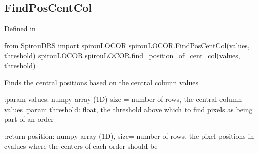 \begin{minipage}{\textwidth}
\subsection{FindPosCentCol}

Defined in \spirouLOCOR{}

\begin{pythonbox}
from SpirouDRS import spirouLOCOR
spirouLOCOR.FindPosCentCol(values, threshold)
spirouLOCOR.spirouLOCOR.find_position_of_cent_col(values, threshold)
\end{pythonbox}

\begin{pythondocstring}
Finds the central positions based on the central column values

:param values: numpy array (1D) size = number of rows,
                the central column values
:param threshold: float, the threshold above which to find pixels as being
                  part of an order

:return position: numpy array (1D), size= number of rows,
                  the pixel positions in cvalues where the centers of each
                  order should be
\end{pythondocstring}
\end{minipage}


